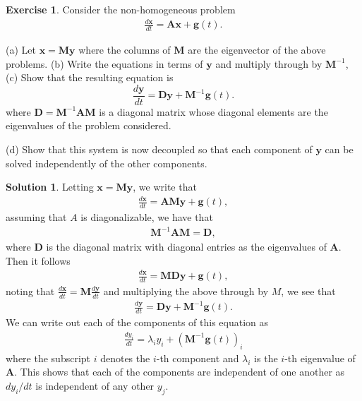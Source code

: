 \documentclass[12pt]{article}
\renewcommand{\vec}[1]{\mathbf{#1}}
\theoremstyle{definition}
\newtheorem{exer}{Exercise}
\newtheorem{sol}{Solution}
\theoremstyle{remark}
\begin{document}
\begin{exer}
 Consider the non-homogeneous problem
 \begin{align*}
     \frac{d \vec{x}}{ d t } = \vec{A} \vec{x} + \vec{g}(t).
 \end{align*}

 (a) Let $\vec{x} = \vec{M} \vec{y}$  where the columns of $\vec{M}$ are the eigenvector of the above problems.
 (b) Write the equations in terms of $\vec{y}$ and multiply through by $\vec{M}^{-1}$,
 (c) Show that the resulting equation is
 \begin{equation*}
      \frac{d \vec{y}}{ d t } = \vec{D} \vec{y} + \vec{M}^{-1}\vec{g}(t).
 \end{equation*}
 where $\vec{D} = \vec{M}^{-1}\vec{A}\vec{M}$ is a diagonal matrix whose diagonal elements are the eigenvalues of the problem considered.

 (d) Show that this system is now decoupled so that each component of $\vec{y}$ can be solved independently of the other components.
\end{exer}

\begin{sol}
Letting $\vec{x} = \vec{M} \vec{y}$, we write that 
\begin{align*}
\frac{d \vec{x}}{ d t } = \vec{A} \vec{M} \vec{y} + \vec{g}(t),
\end{align*}
assuming that $A$ is diagonalizable, we have that 
\begin{align*}
\vec{M}^{-1} \vec{A} \vec{M} = \vec{D},
\end{align*}
where $\vec{D}$ is the diagonal matrix with diagonal entries as the eigenvalues of $\vec{A}$. Then it follows
\begin{align*}
\frac{d \vec{x}}{ d t } = \vec{M} \vec{D} \vec{y} + \vec{g}(t),
\end{align*}
noting that $\frac{d \vec{x}}{dt} = \vec{M} \frac{ d \vec{y} }{dt}$ and multiplying the above through by $M$, we see that
\begin{align*}
    \frac{d \vec{y}}{dt} = \vec{D} \vec{y} + \vec{M}^{-1}\vec{g}(t).
\end{align*}
We can write out each of the components of this equation as 
\begin{align*}
    \frac{d y_{i}}{dt} = \lambda_{i} y_{i} + (\vec{M}^{-1} \vec{g}(t))_{i}
\end{align*}
where the subscript $i$ denotes the $i$-th component and $\lambda_{i}$ is the $i$-th eigenvalue of $\vec{A}$. This shows that each of the components are independent of one another as $d y_{i} / dt$ is independent of any other $y_{j}$.
\end{sol}
\end{document}
